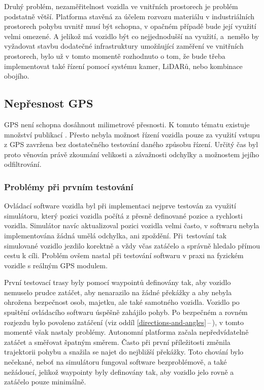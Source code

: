 \documentclass[czech, bachelor]{diploma}
\newcommand{\peteref}[1]{\ref{#1}\,--\,\nameref{#1}}
\begin{document}
Druhý problém, nezaměřitelnost vozidla ve vnitřních prostorech je problém podstatně větší. Platforma stavěná za účelem rozvozu
materiálu v industriálních prostorech pohybu uvnitř musí být schopna, v opačném případě bude její využití velmi omezené. A jelikož
má vozidlo být co nejjednodušší na využití, a~nemělo by vyžadovat stavbu dodatečné infrastruktury umožňující zaměření ve vnitřních
prostorech, bylo už v tomto momentě rozhodnuto o tom, že bude třeba implementovat také řízení pomocí systému kamer, LiDARů, nebo
kombinace obojího.

\subsection{Nepřesnost GPS} \label{gps-inaccuracy}

GPS není schopna dosáhnout milimetrové přesnosti. K tomuto tématu existuje množství publikací \cite{gps-inaccuracy-source}. Přesto
nebyla možnost řízení vozidla pouze za využití vstupu z GPS zavržena bez dostatečného testování daného způsobu řízení. Určitý čas
byl proto věnován právě zkoumání velikosti a závažnosti odchylky a možnostem jejího odfiltrování.

\subsubsection{Problémy při prvním testování}

Ovládací software vozidla byl při implementaci nejprve testován za využití simulátoru, který pozici vozidla počítá z přesně
definované pozice a rychlosti vozidla. Simulátor navíc aktualizoval pozici vozidla velmi často, v softwaru nebyla implementována
žádná umělá odchylka, ani zpoždění. Při~testování tak simulované vozidlo jezdilo korektně a vždy včas zatáčelo a správně hledalo
přímou cestu k cíli. Problém ovšem nastal při testování softwaru v praxi na fyzickém vozidle s reálným GPS modulem.

První testovací trasy byly pomocí waypointů definovány tak, aby vozidlo nemuselo prudce zatáčet, aby nenarazilo na žádné překážky
a aby nebyla ohrožena bezpečnost osob, majetku, ale také samotného vozidla. Vozidlo po spuštění ovládacího softwaru úspěšně
zahájilo pohyb. Po bezpečném a rovném rozjezdu bylo povoleno zatáčení (viz oddíl \peteref{directions-and-angles}), v tomto
momentě však nastaly problémy. Autonomní platforma začala nepředvídatelně zatáčet a směřovat špatným směrem. Často při první
příležitosti změnila trajektorii pohybu a snažila se najet do nejbližší překážky. Toto chování bylo nečekané, neboť na simulátoru
fungoval software bezproblémově, a také nežádoucí, jelikož waypointy byly definovány tak, aby vozidlo jelo rovně a zatáčelo pouze
minimálně.
\end{document}
